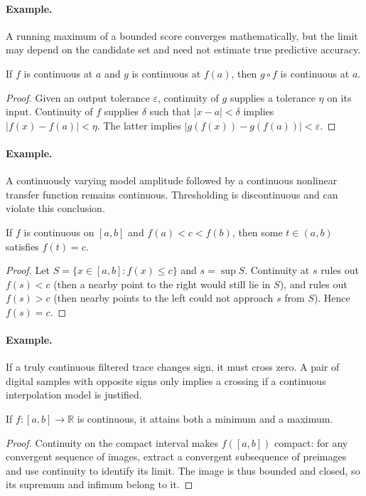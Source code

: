 \paragraph{Example.} A running maximum of a bounded score converges mathematically, but the limit may depend on the candidate set and need not estimate true predictive accuracy.

\begin{proposition}If $f$ is continuous at $a$ and $g$ is continuous at $f(a)$, then $g\circ f$ is continuous at $a$.\end{proposition}
\begin{proof}Given an output tolerance $\varepsilon$, continuity of $g$ supplies a tolerance $\eta$ on its input. Continuity of $f$ supplies $\delta$ such that $|x-a|<\delta$ implies $|f(x)-f(a)|<\eta$. The latter implies $|g(f(x))-g(f(a))|<\varepsilon$.\end{proof}
\paragraph{Example.} A continuously varying model amplitude followed by a continuous nonlinear transfer function remains continuous. Thresholding is discontinuous and can violate this conclusion.

\begin{theorem}If $f$ is continuous on $[a,b]$ and $f(a)<c<f(b)$, then some $t\in(a,b)$ satisfies $f(t)=c$.\end{theorem}
\begin{proof}Let $S=\{x\in[a,b]:f(x)\leq c\}$ and $s=\sup S$. Continuity at $s$ rules out $f(s)<c$ (then a nearby point to the right would still lie in $S$), and rules out $f(s)>c$ (then nearby points to the left could not approach $s$ from $S$). Hence $f(s)=c$.\end{proof}
\paragraph{Example.} If a truly continuous filtered trace changes sign, it must cross zero. A pair of digital samples with opposite signs only implies a crossing if a continuous interpolation model is justified.

\begin{theorem}If $f:[a,b]\to\mathbb R$ is continuous, it attains both a minimum and a maximum.\end{theorem}
\begin{proof}Continuity on the compact interval makes $f([a,b])$ compact: for any convergent sequence of images, extract a convergent subsequence of preimages and use continuity to identify its limit. The image is thus bounded and closed, so its supremum and infimum belong to it.\end{proof}
